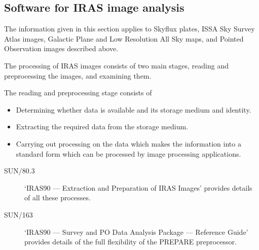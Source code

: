 \subsection{Software for IRAS image analysis}
\label{m:imsoft}
The information given in this section applies to Skyflux plates, ISSA Sky Survey
Atlas images, Galactic Plane and Low Resolution All Sky maps, and Pointed
Observation images described above.

The processing of IRAS images consists of two main stages, reading and
preprocessing the images, and examining them.

The reading and preprocessing stage consists of
\begin{itemize}
\item Determining whether data is available and its storage medium and identity.
\item Extracting the required data from the storage medium.
\item Carrying out processing on the data which makes the information into a
standard form which can be processed by image processing applications.
\end{itemize}
\begin{description}
\item [SUN/80.3] `IRAS90 --- Extraction and
Preparation of IRAS Images' provides details of all these
processes.
\item [SUN/163] `IRAS90 --- Survey and PO Data Analysis Package --- Reference
Guide' provides details of the full flexibility of the PREPARE preprocessor.
\end{description}

